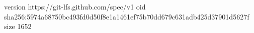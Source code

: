 version https://git-lfs.github.com/spec/v1
oid sha256:5974a68750bc493fd0d50f8e1a1461ef75b70dd679c631adb425d37901d5627f
size 1652
